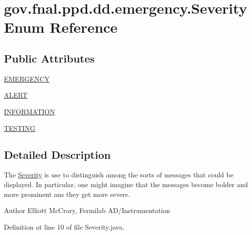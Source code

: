 \hypertarget{enumgov_1_1fnal_1_1ppd_1_1dd_1_1emergency_1_1Severity}{\section{gov.\-fnal.\-ppd.\-dd.\-emergency.\-Severity Enum Reference}
\label{enumgov_1_1fnal_1_1ppd_1_1dd_1_1emergency_1_1Severity}
}
\subsection*{Public Attributes}
\begin{DoxyCompactItemize}
\item 
\hyperlink{enumgov_1_1fnal_1_1ppd_1_1dd_1_1emergency_1_1Severity_a611bc0cf1463a7419a9d2cd14c683578}{E\-M\-E\-R\-G\-E\-N\-C\-Y}
\item 
\hyperlink{enumgov_1_1fnal_1_1ppd_1_1dd_1_1emergency_1_1Severity_ab2b0f7c4e6222e22432f49393a71091c}{A\-L\-E\-R\-T}
\item 
\hyperlink{enumgov_1_1fnal_1_1ppd_1_1dd_1_1emergency_1_1Severity_aaf755550765aa7e569baf503397ecd12}{I\-N\-F\-O\-R\-M\-A\-T\-I\-O\-N}
\item 
\hyperlink{enumgov_1_1fnal_1_1ppd_1_1dd_1_1emergency_1_1Severity_ac5e5ede059fb831322252943bb24a7d5}{T\-E\-S\-T\-I\-N\-G}
\end{DoxyCompactItemize}


\subsection{Detailed Description}
The \hyperlink{enumgov_1_1fnal_1_1ppd_1_1dd_1_1emergency_1_1Severity}{Severity} is use to distinguish among the sorts of messages that could be displayed. In particular, one might imagine that the messages become bolder and more prominent ans they get more severe.

\begin{DoxyAuthor}{Author}
Elliott Mc\-Crory, Fermilab A\-D/\-Instrumentation 
\end{DoxyAuthor}


Definition at line 10 of file Severity.\-java.



